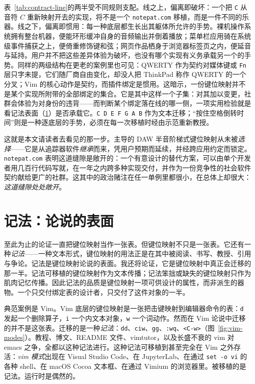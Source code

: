\documentclass[10pt,letterpaper,twocolumn]{article}
\begin{document}
表~\ref{tab:contract-line}的两半受不同规则支配。线之上，偏离即破坏：一个把 \texttt{C} 从音符 $C$ 重新映射开去的实现，将不是一个 \texttt{notepat.com} 移植，而是一件不同的乐器。线之下，偏离即惯用：每一种底层都生长出其躯体所允许的手势。裸机操作系统拥有整台机器，便能环形缓冲自身的音频输出并倒着播放；菜单栏应用骑在系统级事件捕获之上，便倚重修饰键和弦；网页作品栖身于浏览器标签页之内，便延音与延持。用户并不把这些差异体验为破坏，也没有哪个实现有义务承载另一个的手势。同样的两级结构在更老的案例里也可见：QWERTY 作为契约对媒体键或 \texttt{Fn} 层只字未提，它们随厂商自由变化，却没人把 ThinkPad 称作 QWERTY 的一个分叉；Vim 的核心动作是契约，而插件绑定是惯用。这暗示，一份键位映射并不是某个实现所附带的全部绑定的集合。它是其中这样一个子集：对其加以变更，社群会体验为对身份的违背——而判断某个绑定落在线的哪一侧，一项实用检验就是看记法表面（\textsection\ref{sec:notation}）是否承载它。\texttt{C D E F G A B} 作为文本迁移；“按住空格倒转时间”则是一种逐底层的手势，必须在每一次移植时经由示范重新教授。

这就是本文请读者去看见的那一步。主导的 DAW 半音阶梯式键位映射从未被\emph{选择}——它是从追踪器软件\emph{继承}而来，凭用户预期而延续，并经跨应用约定而锁定。\texttt{notepat.com} 表明这道缝隙是敞开的：一个有意设计的替代方案，可以由单个开发者用几百行代码写就，在一年之内跨多种实现交付，并作为一份竞争性的社会软件契约献给更广的社群。这其中的政治赌注在任一单例里都很小，在总体上却很大：\emph{这道缝隙处处敞开}。

\section{记法：论说的表面}
\label{sec:notation}

至此为止的论证一直把键位映射当作一张表。但键位映射不只是一张表。它还有一种\emph{记法}——一种文本形式，键位映射的用法正是在其中被阅读、书写、教授、引用与争论。记法是键位映射论说的表面。我还将论证，它是键位映射中真正会迁移的那一半。记法可移植的键位映射作为文本传播；记法笨拙或缺失的键位映射只作为肌肉记忆传播。因此记法的品质是键位映射一项可供设计的属性，而非派生的器物。一个只交付绑定表的设计者，只交付了这件对象的一半。

典范案例是 Vim。Vim 底层的键位映射是一张把击键映射到编辑器命令的表：\texttt{d} 发起一个删除算子，\texttt{i} 一个内文本对象，\texttt{w} 一个词动作。然而在 Vim 论说中迁移的并不是这张表。迁移的是一种\emph{记法}：\texttt{dd}、\texttt{ciw}、\texttt{gg}、\texttt{:wq}、\texttt{<C-w>}（图~\ref{fig:vim-modes}）。教程、博文、README 文件、vimtutor，以及长盛不衰的 vim 对 emacs 之争，全都以这种记法进行。这种记法可移植到甚至完全在 Vim 之外存活：\emph{vim 模式}出现在 Visual Studio Code、在 JupyterLab、在通过 \texttt{set -o vi} 的各种 shell、在 macOS Cocoa 文本框、在通过 Vimium 的浏览器里。被移植的是记法。运行时是偶然的。
\end{document}
